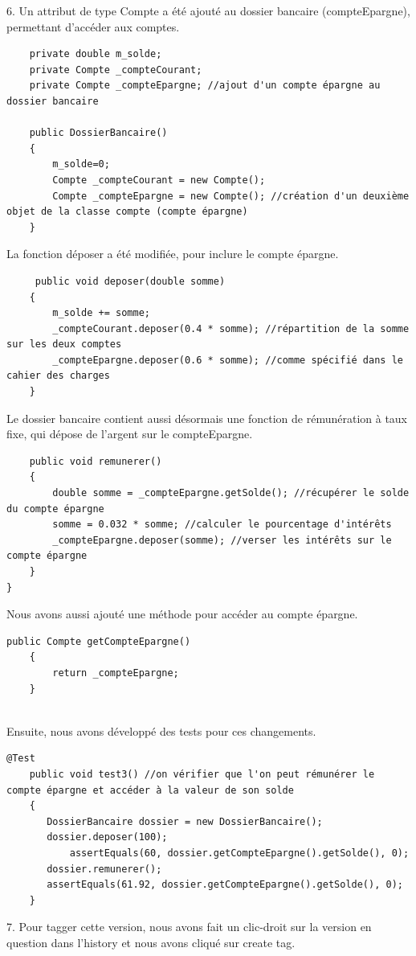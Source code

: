 \documentclass{article}
\begin{document}
6.
Un attribut de type Compte a été ajouté au dossier bancaire (compteEpargne), permettant d'accéder aux comptes.
\begin{lstlisting}
    private double m_solde;
	private Compte _compteCourant;
	private Compte _compteEpargne; //ajout d'un compte épargne au dossier bancaire
	
    public DossierBancaire()
    {
    	m_solde=0;
    	Compte _compteCourant = new Compte();
    	Compte _compteEpargne = new Compte(); //création d'un deuxième objet de la classe compte (compte épargne)
    }
\end{lstlisting}
La fonction déposer a été modifiée, pour inclure le compte épargne.
\begin{lstlisting}
     public void deposer(double somme)
    {
    	m_solde += somme;
    	_compteCourant.deposer(0.4 * somme); //répartition de la somme sur les deux comptes
    	_compteEpargne.deposer(0.6 * somme); //comme spécifié dans le cahier des charges
    }
\end{lstlisting}
Le dossier bancaire contient aussi désormais une fonction de rémunération à taux fixe, qui dépose de l'argent sur le compteEpargne.
\begin{lstlisting}
    public void remunerer()
    {
    	double somme = _compteEpargne.getSolde(); //récupérer le solde du compte épargne
    	somme = 0.032 * somme; //calculer le pourcentage d'intérêts
    	_compteEpargne.deposer(somme); //verser les intérêts sur le compte épargne
    }
}
\end{lstlisting}
Nous avons aussi ajouté une méthode pour accéder au compte épargne.
\begin{lstlisting}
public Compte getCompteEpargne()
    {
    	return _compteEpargne;
    }
    
\end{lstlisting}

Ensuite, nous avons développé des tests pour ces changements.
\begin{lstlisting}
@Test  
	public void test3() //on vérifier que l'on peut rémunérer le compte épargne et accéder à la valeur de son solde
	{
	   DossierBancaire dossier = new DossierBancaire();
	   dossier.deposer(100);
           assertEquals(60, dossier.getCompteEpargne().getSolde(), 0);	
	   dossier.remunerer();
	   assertEquals(61.92, dossier.getCompteEpargne().getSolde(), 0);	
	}
\end{lstlisting}


7.
Pour tagger cette version, nous avons fait un clic-droit sur la version en question dans l'history et nous avons cliqué sur create tag.
\end{document}

